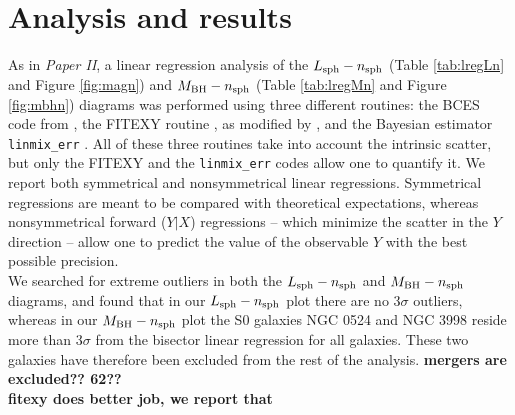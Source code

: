 \documentclass[preprint2]{emulateapj}
\begin{document}


\section{Analysis and results}
\label{sec:anal}
As in \emph{Paper II}, a linear regression analysis of the $L_{\rm sph} - n_{\rm sph}$ 
(Table \ref{tab:lregLn} and Figure \ref{fig:magn})
and $M_{\rm BH} - n_{\rm sph}$ (Table \ref{tab:lregMn} and Figure \ref{fig:mbhn}) diagrams 
was performed using three different routines: 
the BCES code from \cite{akritasbershady1996}, 
the FITEXY routine \citep{press1992}, as modified by \cite{tremaine2002}, 
and the Bayesian estimator {\tt linmix\_err} \citep{linmixerr}.
All of these three routines take into account the intrinsic scatter, 
but only the FITEXY and the {\tt linmix\_err} codes allow one to quantify it.
We report both symmetrical and nonsymmetrical linear regressions.  
Symmetrical regressions are meant to be compared with theoretical expectations, 
whereas nonsymmetrical forward ($Y|X$) regressions -- which minimize the scatter in the $Y$ direction -- 
allow one to predict the value of the observable $Y$ with the best possible precision. \\
We searched for extreme outliers in both the $L_{\rm sph} - n_{\rm sph}$ and $M_{\rm BH} - n_{\rm sph}$ diagrams, 
and found that in our $L_{\rm sph} - n_{\rm sph}$ plot there are no $3\sigma$ outliers, 
whereas in our $M_{\rm BH} - n_{\rm sph}$ plot 
the S0 galaxies NGC 0524 and NGC 3998 reside more than $3\sigma$ from the bisector linear regression for all galaxies. 
These two galaxies have therefore been excluded from the rest of the analysis. {\bf mergers are excluded?? 62??} \\
{\bf fitexy does better job, we report that} \\
\end{document}
